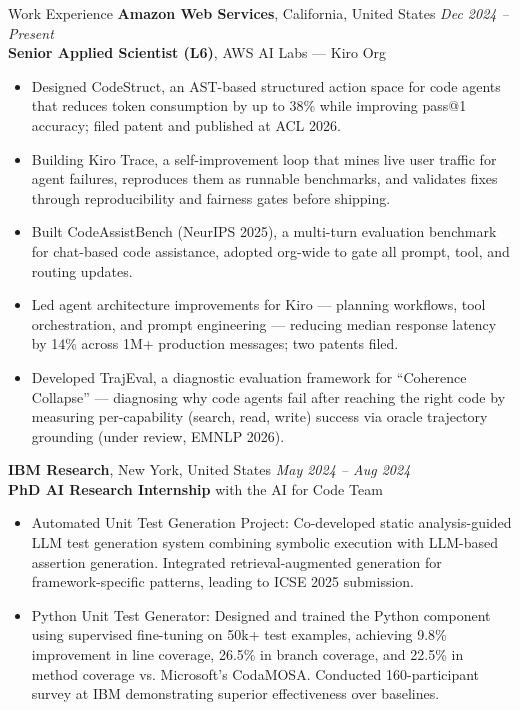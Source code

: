 \documentclass{resume} %
\begin{document}
\begin{rSection}{Work Experience}
{\bf Amazon Web Services}, California, United States \hfill {\em Dec 2024 – Present} \\
{\bf Senior Applied Scientist (L6)}, AWS AI Labs — Kiro Org
\begin{itemize}
    \item Designed CodeStruct, an AST-based structured action space for code agents that reduces token consumption by up to 38\% while improving pass@1 accuracy; filed patent and published at ACL 2026.
    \item Building Kiro Trace, a self-improvement loop that mines live user traffic for agent failures, reproduces them as runnable benchmarks, and validates fixes through reproducibility and fairness gates before shipping.
    \item Built CodeAssistBench (NeurIPS 2025), a multi-turn evaluation benchmark for chat-based code assistance, adopted org-wide to gate all prompt, tool, and routing updates.
    \item Led agent architecture improvements for Kiro --- planning workflows, tool orchestration, and prompt engineering --- reducing median response latency by 14\% across 1M+ production messages; two patents filed.
    \item Developed TrajEval, a diagnostic evaluation framework for ``Coherence Collapse'' --- diagnosing why code agents fail after reaching the right code by measuring per-capability (search, read, write) success via oracle trajectory grounding (under review, EMNLP 2026).
\end{itemize}
{\bf IBM Research}, New York, United States \hfill {\em May 2024 – Aug 2024} \\
{\bf PhD AI Research Internship} with the AI for Code Team
\begin{itemize}
    \item Automated Unit Test Generation Project: Co-developed static analysis-guided LLM test 
  generation system combining symbolic execution with LLM-based assertion generation. 
  Integrated retrieval-augmented generation for framework-specific patterns, leading to 
  ICSE 2025 submission.
  \item Python Unit Test Generator: Designed and trained the Python component using supervised 
  fine-tuning on 50k+ test examples, achieving 9.8\% improvement in line coverage, 26.5\% 
  in branch coverage, and 22.5\% in method coverage vs. Microsoft's CodaMOSA. Conducted 
  160-participant survey at IBM demonstrating superior effectiveness over baselines.

\end{itemize}
\end{rSection}
\end{document}
